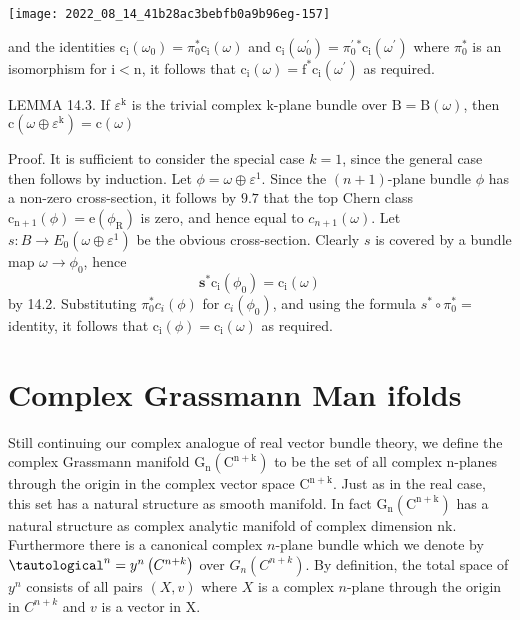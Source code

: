 \documentclass[10pt]{article}
\begin{document}
\texttt{[image: 2022\_08\_14\_41b28ac3bebfb0a9b96eg-157]}

and the identities $\mathrm{c}_{\mathrm{i}}\left(\omega_{0}\right)=\pi_{0}^{*} \mathrm{c}_{\mathrm{i}}(\omega)$ and $\mathrm{c}_{\mathrm{i}}\left(\omega_{0}^{\prime}\right)=\pi_{0}^{\prime}{ }^{*} \mathrm{c}_{\mathrm{i}}\left(\omega^{\prime}\right)$ where $\pi_{0}^{*}$ is an isomorphism for $\mathrm{i}<\mathrm{n}$, it follows that $\mathrm{c}_{\mathrm{i}}(\omega)=\mathrm{f}^{*} \mathrm{c}_{\mathrm{i}}\left(\omega^{\prime}\right)$ as required.

LEMMA 14.3. If $\varepsilon^{\mathrm{k}}$ is the trivial complex $\mathrm{k}$-plane bundle over $\mathrm{B}=\mathrm{B}(\omega)$, then $\mathrm{c}\left(\omega \oplus \varepsilon^{\mathrm{k}}\right)=\mathrm{c}(\omega)$

Proof. It is sufficient to consider the special case $k=1$, since the general case then follows by induction. Let $\phi=\omega \oplus \varepsilon^{1}$. Since the $(n+1)$-plane bundle $\phi$ has a non-zero cross-section, it follows by $9.7$ that the top Chern class $\mathrm{c}_{\mathrm{n}+1}(\phi)=\mathrm{e}\left(\phi_{\mathrm{R}}\right)$ is zero, and hence equal to $c_{n+1}(\omega)$. Let $s: B \rightarrow E_{0}\left(\omega \oplus \varepsilon^{1}\right)$ be the obvious cross-section. Clearly $s$ is covered by a bundle map $\omega \rightarrow \phi_{0}$, hence
$$
\mathbf{s}^{*} \mathrm{c}_{\mathrm{i}}\left(\phi_{0}\right)=\mathrm{c}_{\mathrm{i}}(\omega)
$$
by 14.2. Substituting $\pi_{0}^{*} c_{i}(\phi)$ for $c_{i}\left(\phi_{0}\right)$, and using the formula $s^{*} \circ \pi_{0}^{*}=$ identity, it follows that $\mathrm{c}_{\mathrm{i}}(\phi)=\mathrm{c}_{\mathrm{i}}(\omega)$ as required.

\section{Complex Grassmann Man ifolds}
Still continuing our complex analogue of real vector bundle theory, we define the complex Grassmann manifold $\mathrm{G}_{\mathrm{n}}\left(\mathrm{C}^{\mathrm{n}+\mathrm{k}}\right)$ to be the set of all complex $\mathrm{n}$-planes through the origin in the complex vector space $\mathrm{C}^{\mathrm{n}+\mathrm{k}}$. Just as in the real case, this set has a natural structure as smooth manifold. In fact $\mathrm{G}_{\mathrm{n}}\left(\mathrm{C}^{\mathrm{n}+\mathrm{k}}\right)$ has a natural structure as complex analytic manifold of complex dimension nk. Furthermore there is a canonical complex $n$-plane bundle which we denote by $\tautological^{n}=y^{n}\left(C^{n+k}\right)$ over $G_{n}\left(C^{n+k}\right)$. By definition, the total space of $y^{n}$ consists of all pairs $(X, v)$ where $X$ is a complex $n$-plane through the origin in $C^{n+k}$ and $v$ is a vector in $\mathrm{X}$.
\end{document}
